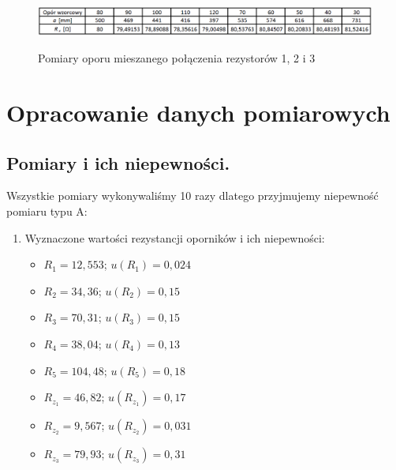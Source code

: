 \documentclass [a4paper,11pt]{article}
\begin{document}
	\begin{figure}[!h]
		\centering
		\begin{center}
		\caption{Pomiary oporu mieszanego połączenia rezystorów 1, 2 i 3}
		\includegraphics[width=\textwidth]{(R1zR2)+R3}
		\label{fig:(r1zr2)+r3}
		\end{center}
	\end{figure}
		
	

	\renewcommand*{\figurename}{Wykres} 
	\setcounter{figure}{0}
	\newpage
	\section{Opracowanie danych pomiarowych}\label{sec:opr}
	\subsection{Pomiary i ich niepewności.}
		
		Wszystkie pomiary wykonywaliśmy 10 razy dlatego przyjmujemy niepewność pomiaru typu A:
		
		\begin{enumerate}
			\item Wyznaczone wartości rezystancji oporników i ich niepewności:
			\begin{itemize}
				\item $R_1=12,553$; $u(R_1)=0,024$
				\item $R_2=34,36$; $u(R_2)=0,15$
				\item $R_3=70,31$; $u(R_3)=0,15$
				\item $R_4=38,04$; $u(R_4)=0,13$
				\item $R_5=104,48$; $u(R_5)=0,18$
				\item $R_{z_1}=46,82$; $u(R_{z_1})=0,17$
				\item $R_{z_2}=9,567$; $u(R_{z_2})=0,031$
				\item $R_{z_3}=79,93$; $u(R_{z_3})=0,31$
			\end{itemize}	
		\end{enumerate} 
	
\end{document}
